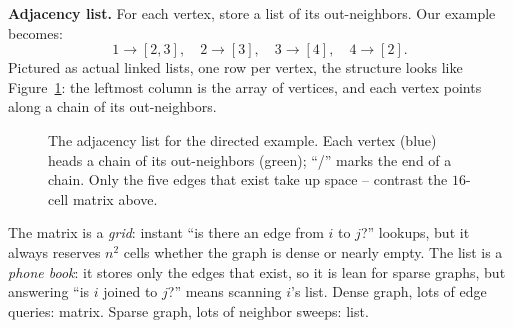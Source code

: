 \textbf{Adjacency list.} For each vertex, store a list of its out-neighbors. Our
example becomes:
\[
1 \to [2, 3], \quad 2 \to [3], \quad 3 \to [4], \quad 4 \to [2].
\]
Pictured as actual linked lists, one row per vertex, the structure looks like
Figure~\ref{ch39:fig-adjlist}: the leftmost column is the array of vertices, and
each vertex points along a chain of its out-neighbors.

\begin{figure}[H]
\begin{center}
\end{center}
\caption{The adjacency list for the directed example. Each vertex (blue) heads a
chain of its out-neighbors (green); ``/'' marks the end of a chain. Only the five
edges that exist take up space -- contrast the $16$-cell matrix above.}
\label{ch39:fig-adjlist}
\end{figure}

\begin{intuitionbox}
The matrix is a \emph{grid}: instant ``is there an edge from $i$ to $j$?''
lookups, but it always reserves $n^2$ cells whether the graph is dense or nearly
empty. The list is a \emph{phone book}: it stores only the edges that exist, so it
is lean for sparse graphs, but answering ``is $i$ joined to $j$?'' means scanning
$i$'s list. Dense graph, lots of edge queries: matrix. Sparse graph, lots of
neighbor sweeps: list.
\end{intuitionbox}

